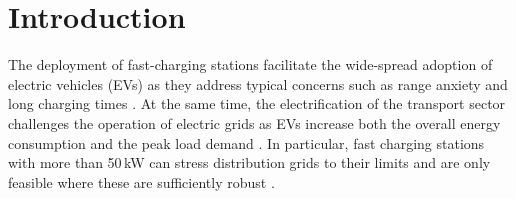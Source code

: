 \documentclass[final,5p,times,twocolumn]{elsarticle}
\begin{document}
\section{Introduction}

The deployment of fast-charging stations facilitate the wide-spread adoption of electric vehicles (EVs) as they address typical concerns such as range anxiety and long charging times \cite{Brand.2017, Zhang.2018b}. At the same time, the electrification of the transport sector challenges the operation of electric grids as EVs increase both the overall energy consumption and the peak load demand \cite{Yilmaz.2013,Calearo.2019}. In particular, fast charging stations with more than 50\,kW can stress distribution grids to their limits and are only feasible where these are sufficiently robust \cite{Mauri.2012,Dharmakeerthi.2014}. 
\end{document}
